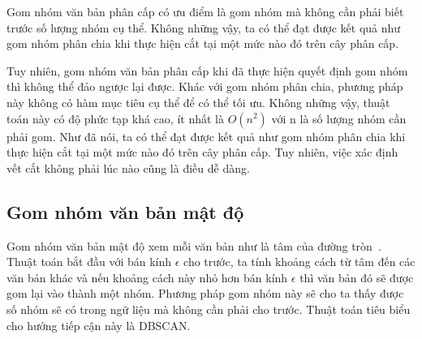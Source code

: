 Gom nhóm văn bản phân cấp có ưu điểm là gom nhóm mà không cần phải biết trước số lượng nhóm cụ thể.
Không những vậy, ta có thể đạt được kết quả như gom nhóm phân chia khi thực hiện cắt tại một mức nào đó trên cây phân cấp.

Tuy nhiên, gom nhóm văn bản phân cấp khi đã thực hiện quyết định gom nhóm thì không thể đảo ngược lại được.
Khác với gom nhóm phân chia, phương pháp này không có hàm mục tiêu cụ thể để có thể tối ưu.
Không những vậy, thuật toán này có độ phức tạp khá cao, ít nhất là $O(n^2)$ với n là số lượng nhóm cần phải gom.
Như đã nói, ta có thể đạt được kết quả như gom nhóm phân chia khi thực hiện cắt tại một mức nào đó trên cây phân cấp.
Tuy nhiên, việc xác định vết cắt không phải lúc nào cũng là điều dễ dàng.
%

\subsection{Gom nhóm văn bản mật độ} 
Gom nhóm văn bản mật độ xem mỗi văn bản như là tâm của đường tròn~\cite{Manojit-Nandi}.
Thuật toán bắt đầu với bán kính $\epsilon$ cho trước, ta tính khoảng cách từ tâm đến các văn bản khác và nếu khoảng cách này nhỏ hơn bán kính $\epsilon$ thì văn bản đó sẽ được gom lại vào thành một nhóm.
Phương pháp gom nhóm này sẽ cho ta thấy được số nhóm sẽ có trong ngữ liệu mà không cần phải cho trước.
Thuật toán tiêu biểu cho hướng tiếp cận này là DBSCAN.

